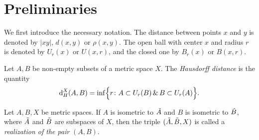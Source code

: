 \section{Preliminaries}\label{sec: preliminaries}

We first introduce the necessary notation.
The distance between points $x$ and $y$ is denoted by $|xy|$, $d(x,y)$ or $\rho(x,y)$.
The open ball with center $x$ and radius $r$ is denoted by $U_r(x)$ or $U(x,r)$, and the closed one by $B_r(x)$ or $B(x,r)$.

\begin{define}
  Let $A,B$ be non-empty subsets of a metric space $X$.
The \emph{Hausdorff distance} is the quantity
  \begin{equation*}
      \operatorname{d}_{H}^{X}(A, B) = \inf \Bigl\{r\colon A \subset U_r(B)\, \&\, B \subset U_r (A)\Bigr\}.
  \end{equation*}
\end{define}

\begin{define}
  Let $A,B,X$ be metric spaces.
If $A$ is isometric to $\tilde{A}$ and $B$ is isometric to $\tilde{B}$, where $\tilde{A}$ and $\tilde{B}$ are subspaces of $X$, then the triple $(\tilde{A}, \tilde{B}, X)$ is called a \emph{realization of the pair} $(A, B)$.
\end{define}
      

